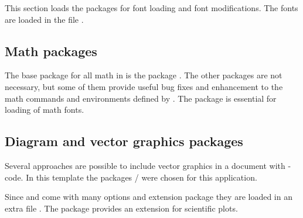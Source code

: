 This section loads the packages for font loading and font modifications. The fonts are loaded in the file  .


\subsection{Math packages}
\label{sec:packages:math}

The base package for all math in \latex is the package . The other packages are not necessary, but some of them provide useful bug fixes and enhancement to the math commands and environments defined by . The package  is essential for loading of math fonts.




\subsection{Diagram and vector graphics packages}
\label{sec:packages:pgf}

Several approaches are possible to include vector graphics in a \latex document with \latex-code. In this template the packages / were chosen for this application.

Since  and  come with many options and 
extension package they are loaded in an extra file 
. The package  
provides an extension for scientific plots.

